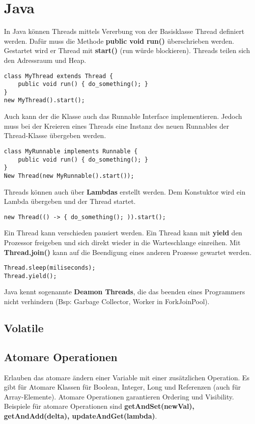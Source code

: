 \section{Java}
In Java können Threads mittels Vererbung von der Basisklasse Thread definiert werden. Dafür muss die Methode \textbf{public void run()} überschrieben werden. Gestartet wird er Thread mit \textbf{start()} (run würde blockieren). Threads teilen sich den Adressraum und Heap.

\begin{lstlisting}[style=Java]
class MyThread extends Thread {
	public void run() { do_something(); }
}
new MyThread().start();
\end{lstlisting}

Auch kann der die Klasse auch das Runnable Interface implementieren. Jedoch muss bei der Kreieren eines Threads eine Instanz des neuen Runnables der Thread-Klasse übergeben werden.

\begin{lstlisting}[style=Java]
class MyRunnable implements Runnable {
	public void run() { do_something(); }
}
New Thread(new MyRunnable().start());
\end{lstlisting}

Threads können auch über \textbf{Lambdas} erstellt werden. Dem Konstuktor wird ein Lambda übergeben und der Thread startet.

\begin{lstlisting}[style=Java]
new Thread(() -> { do_something(); )).start();
\end{lstlisting}

Ein Thread kann verschieden pausiert werden. Ein Thread kann mit \textbf{yield} den Prozessor freigeben und sich direkt wieder in die Warteschlange einreihen. Mit \textbf{Thread.join()} kann auf die Beendigung eines anderen Prozesse gewartet werden.

\begin{lstlisting}[style=Java]
Thread.sleep(miliseconds); 
Thread.yield();
\end{lstlisting}

Java kennt sogenannte \textbf{Deamon Threads}, die das beenden eines Programmers nicht verhindern (Bsp: Garbage Collector, Worker in ForkJoinPool).

\subsection{Volatile}

\subsection{Atomare Operationen}
Erlauben das atomare ändern einer Variable mit einer zusätzlichen Operation. Es gibt für Atomare Klassen für Boolean, Integer, Long und Referenzen (auch für Array-Elemente). Atomare Operationen garantieren Ordering und Visibility. Beispiele für atomare Operationen sind \textbf{getAndSet(newVal), getAndAdd(delta), updateAndGet(lambda)}.

